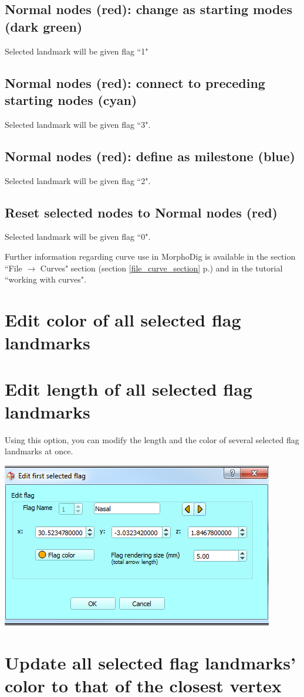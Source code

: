 \subsection{Normal nodes (red): change as starting modes (dark green)}
Selected landmark will be given flag ``1"


\subsection{Normal nodes (red): connect to preceding starting nodes (cyan)}
Selected landmark will be given flag ``3".


\subsection{Normal nodes (red): define as milestone (blue)}
Selected landmark will be given flag ``2".

\subsection{Reset selected nodes to Normal nodes (red)}
Selected landmark will be given flag ``0".

\noindent Further information regarding curve use in MorphoDig is available in the section ``File $\rightarrow$
Curves" section (section \ref{file_curve_section} p.\pageref{file_curve_section}) and in the tutorial ``working with curves".

\section{Edit color of all selected flag landmarks}
\section{Edit length of all selected flag landmarks}
\noindent
\begin{minipage}{0.5\textwidth}
Using this option, you can modify the length and the color
of several selected flag landmarks at once.
\end{minipage}    
\begin{minipage}{0.5\textwidth}\centering
  \includegraphics[scale=0.5]{images/Edit_selected_landmarks/Edit_flags.png}
 \end{minipage} 
\noindent


\section{Update all selected flag landmarks' color to that of the closest vertex}



